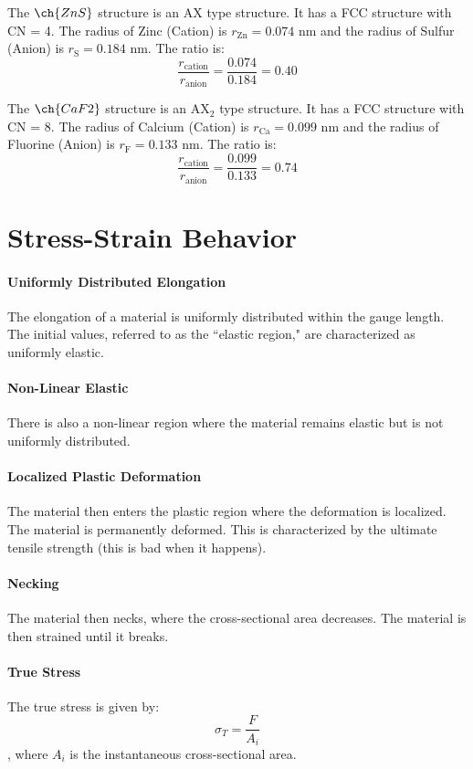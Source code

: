 \documentclass[11pt]{report}
\begin{document}
\begin{example}
    The $\ch{ZnS}$ structure is an AX type structure. It has a FCC structure with CN = 4. The radius of Zinc (Cation) is $r_{\text{Zn}} = 0.074$ nm and the radius of Sulfur (Anion) is $r_{\text{S}} = 0.184$ nm. The ratio is:
    $$ \frac{r_{\text{cation}}}{r_{\text{anion}}} = \frac{0.074}{0.184} = 0.40 $$
\end{example}
\begin{example}
    The $\ch{CaF2}$ structure is an AX$_2$ type structure. It has a FCC structure with CN = 8. The radius of Calcium (Cation) is $r_{\text{Ca}} = 0.099$ nm and the radius of Fluorine (Anion) is $r_{\text{F}} = 0.133$ nm. The ratio is:
    $$ \frac{r_{\text{cation}}}{r_{\text{anion}}} = \frac{0.099}{0.133} = 0.74 $$
\end{example}
\section{Stress-Strain Behavior}
\paragraph{Uniformly Distributed Elongation} The elongation of a material is uniformly distributed within the gauge length. The initial values, referred to as the ``elastic region," are characterized as uniformly elastic. 
\paragraph{Non-Linear Elastic} There is also a non-linear region where the material remains elastic but is not uniformly distributed.
\paragraph{Localized Plastic Deformation} The material then enters the plastic region where the deformation is localized. The material is permanently deformed. This is characterized by the ultimate tensile strength (this is bad when it happens).
\paragraph{Necking} The material then necks, where the cross-sectional area decreases. The material is then strained until it breaks.
\paragraph{True Stress} The true stress is given by:
\begin{equation}
    \sigma_T = \frac{F}{A_i}
\end{equation}
, where $A_i$ is the instantaneous cross-sectional area.
\end{document}
